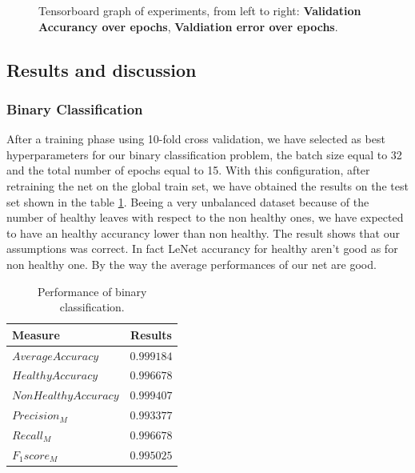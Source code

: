 \begin{figure}
\begin{center}
	\begin{center}
		\caption{Tensorboard graph of experiments, from left to right: \textbf{Validation Accurancy over epochs}, \textbf{Valdiation error over epochs}. }
		\label{fig:tensorboard}
	\end{center}
	\vspace{-15pt}
\end{center}
\end{figure}

\subsection{Results and discussion}
\subsubsection{Binary Classification}
After a training phase using 10-fold cross validation, we have selected as best hyperparameters for our binary classification problem, the batch size equal to 32 and the total number of epochs equal to 15. With this configuration, after retraining the net on the global train set, we have obtained the results on the test set shown in the table \ref{table:binary}. Beeing a very unbalanced dataset because of the number of healthy leaves with respect to the non healthy ones, we have expected to have an healthy accurancy lower than non healthy. The result shows that our assumptions was correct. In fact LeNet accurancy for healthy aren't good as for non healthy one. By the way the average performances of our net are good.
\begin{table}[H]
	\begin{center}
		\begin{tabular}{|l|c|}
			\hline
			\textbf{Measure} & \textbf{Results} \\ 
			\hline
			$Average Accuracy$ & $0.999184$ \\
			$Healthy Accuracy$ & $0.996678$ \\
			$Non Healthy Accuracy$ & $0.999407$ \\
			$Precision_M$ & $0.993377$ \\
			$Recall_M$ & $0.996678$ \\
			$F_1 score_M$ & $0.995025$ \\
			\hline
		\end{tabular}
	\end{center}
	\caption{Performance of binary classification.}
	\label{table:binary}
\end{table}
